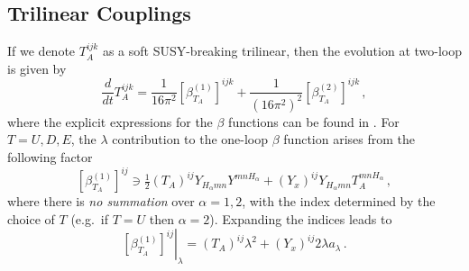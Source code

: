\documentclass[final,3p,times]{elsarticle}
\newcommand{\dt}{\frac{d}{dt}}
\begin{document}
\subsection{Trilinear Couplings}
If we denote $T_A^{ijk}$ as a soft SUSY-breaking trilinear, then the evolution at two-loop is given by 
%
\begin{equation}
\dt T_A^{ijk} = \frac{1}{16\pi^2} \left[\beta_{T_A}^{(1)}\right]^{ijk} 
+ \frac{1}{(16\pi^2)^2} \left[\beta_{T_A}^{(2)}\right]^{ijk}\,,
\end{equation}
%
where the explicit expressions for the $\beta$ functions can be found in \cite{MV94}.  
For $T = U,D,E$, the $\lambda$ contribution to the one-loop $\beta$ function 
arises from the following factor
%
\begin{equation}
\left[\beta_{T_A}^{(1)}\right]^{ij} \ni \tfrac{1}{2} (T_A)^{ij} 
Y_{H_\alpha mn}Y^{mnH_\alpha} + (Y_x)^{ij} Y_{H_\alpha mn}T_A^{mnH_\alpha}\,,
\end{equation}
%
where there is {\it no summation} over $\alpha = 1,2$, with the index 
determined by the choice of $T$ (e.g.\ if $T=U$ then $\alpha = 2$). Expanding 
the indices leads to
%
\begin{equation}
\left.\left[\beta_{T_A}^{(1)}\right]^{ij}\right|_\lambda = (T_A)^{ij}\lambda^2 
+ (Y_x)^{ij} 2\lambda a_\lambda\,. \label{eqn: beta hx}
\end{equation}
%
\end{document}
